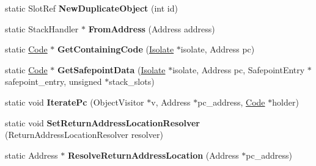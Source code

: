 \begin{DoxyCompactItemize}
\item 
\hypertarget{classv8_1_1internal_1_1_b_a_s_e___e_m_b_e_d_d_e_d_aefb25ee8940cfdeecfd2be5a1ed50fcb}{}static Slot\+Ref {\bfseries New\+Duplicate\+Object} (int id)\label{classv8_1_1internal_1_1_b_a_s_e___e_m_b_e_d_d_e_d_aefb25ee8940cfdeecfd2be5a1ed50fcb}

\item 
\hypertarget{classv8_1_1internal_1_1_b_a_s_e___e_m_b_e_d_d_e_d_adafec0a28c4676c6e284f6749c2ca956}{}static Stack\+Handler $\ast$ {\bfseries From\+Address} (Address address)\label{classv8_1_1internal_1_1_b_a_s_e___e_m_b_e_d_d_e_d_adafec0a28c4676c6e284f6749c2ca956}

\item 
\hypertarget{classv8_1_1internal_1_1_b_a_s_e___e_m_b_e_d_d_e_d_abe2fac7239887381acac77a66bab880a}{}static \hyperlink{classv8_1_1internal_1_1_code}{Code} $\ast$ {\bfseries Get\+Containing\+Code} (\hyperlink{classv8_1_1internal_1_1_isolate}{Isolate} $\ast$isolate, Address pc)\label{classv8_1_1internal_1_1_b_a_s_e___e_m_b_e_d_d_e_d_abe2fac7239887381acac77a66bab880a}

\item 
\hypertarget{classv8_1_1internal_1_1_b_a_s_e___e_m_b_e_d_d_e_d_a0fc558b8fa76eaed5057ff7401317ea4}{}static \hyperlink{classv8_1_1internal_1_1_code}{Code} $\ast$ {\bfseries Get\+Safepoint\+Data} (\hyperlink{classv8_1_1internal_1_1_isolate}{Isolate} $\ast$isolate, Address pc, Safepoint\+Entry $\ast$safepoint\+\_\+entry, unsigned $\ast$stack\+\_\+slots)\label{classv8_1_1internal_1_1_b_a_s_e___e_m_b_e_d_d_e_d_a0fc558b8fa76eaed5057ff7401317ea4}

\item 
\hypertarget{classv8_1_1internal_1_1_b_a_s_e___e_m_b_e_d_d_e_d_a664878f1e80203ab0efcfe8142622c89}{}static void {\bfseries Iterate\+Pc} (Object\+Visitor $\ast$v, Address $\ast$pc\+\_\+address, \hyperlink{classv8_1_1internal_1_1_code}{Code} $\ast$holder)\label{classv8_1_1internal_1_1_b_a_s_e___e_m_b_e_d_d_e_d_a664878f1e80203ab0efcfe8142622c89}

\item 
\hypertarget{classv8_1_1internal_1_1_b_a_s_e___e_m_b_e_d_d_e_d_a094de96cef9f714b902a459e3cef367c}{}static void {\bfseries Set\+Return\+Address\+Location\+Resolver} (Return\+Address\+Location\+Resolver resolver)\label{classv8_1_1internal_1_1_b_a_s_e___e_m_b_e_d_d_e_d_a094de96cef9f714b902a459e3cef367c}

\item 
\hypertarget{classv8_1_1internal_1_1_b_a_s_e___e_m_b_e_d_d_e_d_a4e29fb4201c840e4b83c4ebf3562a049}{}static Address $\ast$ {\bfseries Resolve\+Return\+Address\+Location} (Address $\ast$pc\+\_\+address)\label{classv8_1_1internal_1_1_b_a_s_e___e_m_b_e_d_d_e_d_a4e29fb4201c840e4b83c4ebf3562a049}


\end{DoxyCompactItemize}
